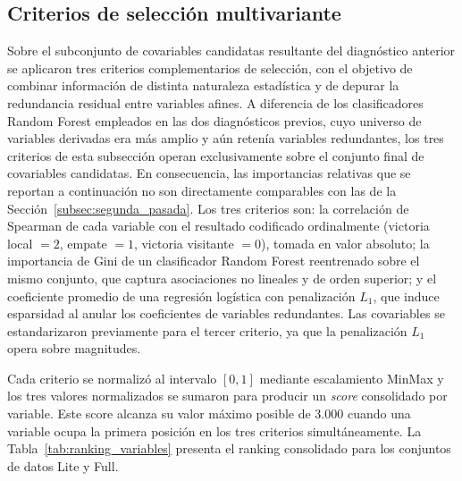 \subsection{Criterios de selecci\'on multivariante}
\label{subsec:criterios_seleccion}

Sobre el subconjunto de covariables candidatas resultante del diagn\'ostico anterior se aplicaron tres criterios complementarios de selecci\'on, con el objetivo de combinar informaci\'on de distinta naturaleza estad\'istica y de depurar la redundancia residual entre variables afines. A diferencia de los clasificadores Random Forest empleados en las dos diagn\'osticos previos, cuyo universo de variables derivadas era m\'as amplio y a\'un reten\'ia variables redundantes, los tres criterios de esta subsecci\'on operan exclusivamente sobre el conjunto final de covariables candidatas. En consecuencia, las importancias relativas que se reportan a continuaci\'on no son directamente comparables con las de la Secci\'on~\ref{subsec:segunda_pasada}. Los tres criterios son: la correlaci\'on de Spearman \cite{spearman1904} de cada variable con el resultado codificado ordinalmente (victoria local $=2$, empate $=1$, victoria visitante $=0$), tomada en valor absoluto; la importancia de Gini de un clasificador Random Forest reentrenado sobre el mismo conjunto, que captura asociaciones no lineales y de orden superior; y el coeficiente promedio de una regresi\'on log\'istica con penalizaci\'on $L_1$, que induce esparsidad al anular los coeficientes de variables redundantes. Las covariables se estandarizaron previamente para el tercer criterio, ya que la penalizaci\'on $L_1$ opera sobre magnitudes.

Cada criterio se normaliz\'o al intervalo $[0,1]$ mediante escalamiento MinMax y los tres valores normalizados se sumaron para producir un \emph{score} consolidado por variable. Este score alcanza su valor m\'aximo posible de $3{.}000$ cuando una variable ocupa la primera posici\'on en los tres criterios simult\'aneamente. La Tabla~\ref{tab:ranking_variables} presenta el ranking consolidado para los conjuntos de datos Lite y Full.

